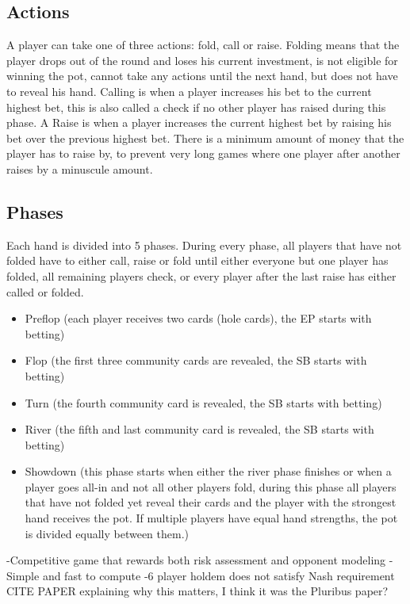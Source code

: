 \subsection{Actions}
A player can take one of three actions: fold, call or raise.
Folding means that the player drops out of the round and loses his current investment, is not eligible for winning the pot, cannot take any actions until the next hand, but does not have to reveal his hand.
Calling is when a player increases his bet to the current highest bet, this is also called a check if no other player has raised during this phase.
A Raise is when a player increases the current highest bet by raising his bet over the previous highest bet. There is a minimum amount of money that the player has to raise by, to prevent very long games where one player after another raises by a minuscule amount.

\subsection{Phases}
Each hand is divided into 5 phases. During every phase, all players that have not folded have to either call, raise or fold until either everyone but one player has folded, all remaining players check, or every player after the last raise has either called or folded.

\begin{itemize}
  \item Preflop (each player receives two cards (hole cards), the EP starts with betting)
  \item Flop (the first three community cards are revealed, the SB starts with betting)
  \item Turn (the fourth community card is revealed, the SB starts with betting)
  \item River (the fifth and last community card is revealed, the SB starts with betting)
  \item Showdown (this phase starts when either the river phase finishes or when a player goes all-in and not all other players fold, during this phase all players that have not folded yet reveal their cards and the player with the strongest hand receives the pot. If multiple players have equal hand strengths, the pot is divided equally between them.)
\end{itemize}


-Competitive game that rewards both risk assessment and opponent modeling
-Simple and fast to compute
-6 player holdem does not satisfy Nash requirement {CITE PAPER explaining why this matters, I think it was the Pluribus paper?}

